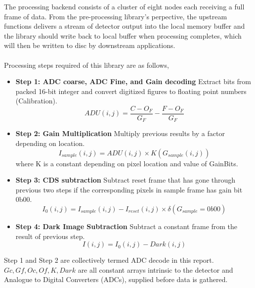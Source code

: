 \documentclass[journal]{IEEEtran}
\begin{document}
The processing backend consists of a cluster of eight nodes each receiving a full frame of data. From the pre-processing library's perpective, the upstream functions delivers a stream of detector output into the local memory buffer and the library should write back to local buffer when processing completes, which will then be written to disc by downstream applications. \\ \\
Processing steps required of this library are as follows,
\begin{itemize}
 \item \textbf{Step 1: ADC coarse, ADC Fine, and Gain decoding} Extract bits from packed 16-bit integer and convert digitized figures to floating point numbers (Calibration).
	\begin{equation}
		ADU(i,j) = \frac{C - O_F}{G_F} - \frac{F - O_F}{G_F}
	\end{equation}
 \item \textbf{Step 2: Gain Multiplication} Multiply previous results by a factor depending on location.
	\begin{equation}
		I_{sample}(i,j) = ADU(i,j) \times K(G_{sample}(i,j))
	\end{equation}
where K is a constant depending on pixel location and value of GainBits.	
 \item \textbf{Step 3: CDS subtraction} Subtract reset frame that has gone through previous two steps if the corresponding pixels in sample frame has gain bit 0b00.
	\begin{equation}	
		I_0(i,j) = I_{sample}(i,j) - I_{reset}(i,j) \times \delta(G_{sample}=0b00)
	\end{equation}
 \item \textbf{Step 4: Dark Image Subtraction} Subtract a constant frame from the result of previous step.
	\begin{equation}
		I(i,j) = I_0(i,j) - Dark(i,j)
	\end{equation}
\end{itemize}

Step 1 and Step 2 are collectively termed ADC decode in this report. $Gc, Gf, Oc, Of, K, Dark$ are all constant arrays intrinsic to the detector and Analogue to Digital Converters (ADCs), supplied before data is gathered.
\end{document}
